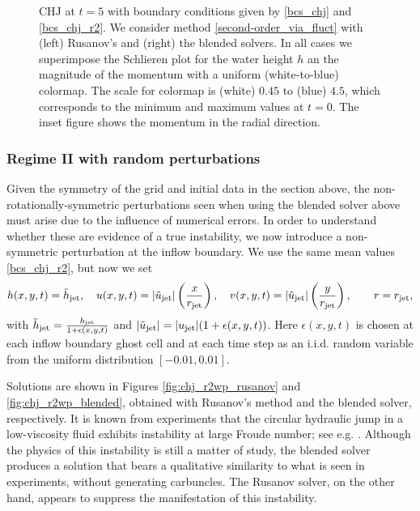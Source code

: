 \documentclass[preprint, 11pt]{article}
\newcommand{\jet}{{\textup{jet}}}
\newcommand{\bfu}{{u}}
\begin{document}
\begin{figure}[!h]
  \caption{CHJ at $t=5$ with boundary conditions given by \eqref{bcs_chj} and \eqref{bcs_chj_r2}. 
    We consider method \eqref{second-order_via_fluct} with (left) Rusanov's
    and (right) the blended solvers. 
    In all cases we superimpose the Schlieren plot for the water height $h$
    an the magnitude of the momentum with a uniform (white-to-blue) colormap. 
    The scale for colormap is (white) $0.45$ to (blue) $4.5$, 
    which corresponds to the minimum and maximum values at $t=0$.
    The inset figure shows the momentum in the radial direction.
    \label{fig:chj_r2_later}}
\end{figure}

\subsubsection{Regime II with random perturbations}\label{sec:regime_iiwp}
Given the symmetry of the grid and initial data in the section above,
the non-rotationally-symmetric perturbations seen when using the blended
solver above must arise due to the influence of numerical errors.
In order to understand whether these are evidence of a true instability,
we now introduce a non-symmetric perturbation at the inflow boundary.
We use the same mean values \eqref{bcs_chj_r2}, but now we set
\begin{subequations}
  \begin{align}
    h(x,y,t)=\tilde h_\jet, \quad
    u(x,y,t)=|\tilde \bfu_\jet| \left(\frac{x}{r_\jet}\right), \quad
    v(x,y,t)=|\tilde \bfu_\jet| \left(\frac{y}{r_\jet}\right), \qquad r=r_\jet,
  \end{align}
\end{subequations}
with $\tilde h_\jet = \frac{h_\jet}{1+\epsilon(x,y,t)}$ and $|\tilde\bfu_\jet|=|\bfu_\jet|(1+\epsilon(x,y,t))$.
Here $\epsilon(x,y,t)$ is chosen at each inflow boundary ghost cell and at each
time step as an i.i.d. random variable from the uniform distribution $[-0.01,0.01]$.

Solutions are shown in Figures \ref{fig:chj_r2wp_rusanov} and \ref{fig:chj_r2wp_blended},
obtained with Rusanov's method and the blended solver, respectively.
It is known from experiments that the circular hydraulic jump in a low-viscosity fluid
exhibits instability at large Froude number; see e.g. \cite[Figure~2]{craik1981circular}.
Although the physics of this instability is still a matter of study, the blended solver
produces a solution that bears a qualitative similarity to what is seen in experiments,
without generating carbuncles.  The Rusanov solver, on the other hand, appears to suppress
the manifestation of this instability.
\end{document}
